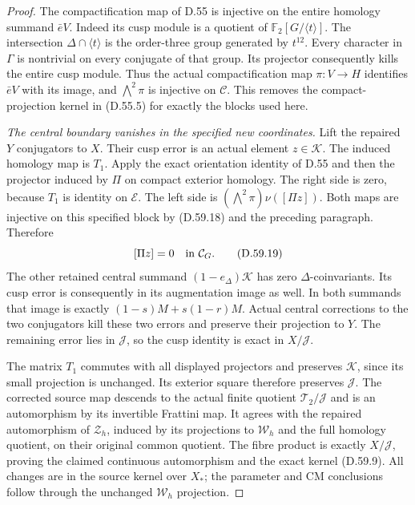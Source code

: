 \begin{proof}
The compactification map of D.55 is
injective on the entire homology
summand \(\bar eV\). Indeed its cusp
module is a quotient of
\(\mathbb F_2[G/\langle t\rangle]\).
The intersection
\(\Delta\cap\langle t\rangle\)
is the order-three group generated by
\(t^{12}\). Every character in
\(\Gamma\) is nontrivial
on every conjugate of that group.
Its projector consequently kills the
entire cusp module. Thus the actual
compactification map
\(\pi:V\to H\) identifies \(\bar eV\)
with its image, and
\(\bigwedge^2\pi\) is injective on
\(\mathcal C\). This removes the
compact-projection kernel in (D.55.5)
for exactly the blocks used here.

\emph{The central boundary vanishes in the specified new coordinates.}
Lift the repaired \(Y\) conjugators
to \(X\). Their cusp error is an
actual element \(z\in\mathcal K\).
The induced homology map is \(T_1\).
Apply the exact orientation identity
of D.55 and then the projector induced
by \(\Pi\) on compact exterior homology.
The right side is zero, because
\(T_1\) is identity on \(\mathscr E\).
The left side is
\((\bigwedge^2\pi)\nu([\Pi z])\).
Both maps are injective on this
specified block by (D.59.18) and the
preceding paragraph. Therefore
\[
                          [\Pi z]=0\quad\hbox{in }\mathcal C_G.
 \tag{D.59.19}
\]
The other retained central summand
\((1-e_\Delta)\mathcal K\) has zero
\(\Delta\)-coinvariants. Its cusp
error is consequently in its
augmentation image as well. In both
summands that image is exactly
\((1-s)M+s(1-r)M\). Actual central
corrections to the two conjugators
kill these two errors and preserve
their projection to \(Y\). The
remaining error lies in \(\mathcal J\),
so the cusp identity is exact in
\(X/\mathcal J\).

The matrix \(T_1\) commutes with
all displayed projectors and preserves
\(\mathcal K\), since its small
projection is unchanged. Its exterior
square therefore preserves
\(\mathcal J\). The corrected source
map descends to the actual finite
quotient \(\mathcal T_2/\mathcal J\)
and is an automorphism by its invertible
Frattini map. It agrees with the
repaired automorphism of \(\mathcal Z_h\),
induced by its projections to \(\mathcal W_h\)
and the full homology quotient, on
their original common quotient.
The fibre product is exactly
\(X/\mathcal J\), proving the claimed
continuous automorphism and the exact
kernel (D.59.9). All changes are in
the source kernel over \(X_*\);
the parameter and CM conclusions
follow through the unchanged
\(\mathcal W_h\) projection.


\end{proof}
